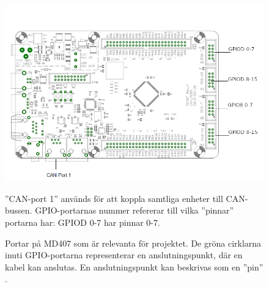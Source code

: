 \begin{figure}[h]
    \begin{center} 
    \includegraphics[scale=0.55]{dokumentation/projektrapport/IMAGES/md407.png}
    \caption{Portar på MD407 som är relevanta för projektet. De gröna cirklarna inuti GPIO-portarna representerar en anslutningspunkt, där en kabel kan anslutas. En anslutningspunkt kan beskrivas som en ''pin'' \cite{md407}.}
    \label{fig:md407}
    \end{center} 
    ''CAN-port 1'' används för att koppla samtliga enheter till CAN-bussen. GPIO-portarnas nummer refererar till vilka ''pinnar'' portarna har: GPIOD 0-7 har pinnar 0-7.
\end{figure}
\newpage